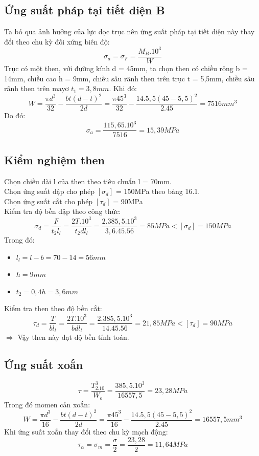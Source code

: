 \subsection{Ứng suất pháp tại tiết diện B}
Ta bỏ qua ảnh hưởng của lực dọc trục nên ứng suất pháp tại tiết diện này thay đổi theo
chu kỳ đối xứng biên độ:
\[  
    \sigma_a = \sigma_F = \frac{M_B.10^3}{W}
\]
Trục có một then, với đường kính d = 45mm, ta chọn then có chiều rộng b = 14mm, chiều cao h = 9mm, chiều sâu rãnh then trên trục t = 5,5mm, chiều sâu rãnh then trên mayơ $t_1 = 3,8 mm$. Khi đó: 
\[
    W = \frac{\pi d^3}{32} - \frac{bt(d-t)^2}{2d} = \frac{\pi 45^3}{32} - \frac{14.5,5(45-5,5)^2}{2.45} = 7516mm^3
\]
Do đó: 
\[
    \sigma_a = \frac{115,65.10^3}{7516} = 15,39MPa
\]
\subsection{Kiểm nghiệm then}
Chọn chiều dài l của then theo tiêu chuẩn l = 70mm.\\
Chọn ứng suất dập cho phép $[\sigma_d]$ = 150MPa theo bảng 16.1. \\
Chọn ứng suất cắt cho phép $[\tau_d]$ = 90MPa \\
Kiểm tra độ bền dập theo công thức:
\[
    \sigma_d = \frac{F}{t_2l_l} = \frac{2T.10^3}{t_2dl_l} = \frac{2.385,5.10^3}{3,6.45.56} = 85MPa < [\sigma_d] = 150MPa
\]
Trong đó:
\begin{itemize}
    \item $l_l = l - b = 70 - 14 = 56mm$
    \item $h = 9mm$
    \item $t_2 = 0,4h = 3,6mm$
\end{itemize}
Kiểm tra then theo độ bền cắt: 
\[
    \tau_d = \frac{T}{bl_l} = \frac{2T.10^3}{bdl_l} = \frac{2.385,5.10^3}{14.45.56} = 21,85MPa < [\tau_d] = 90MPa 
\]
$\Rightarrow$ Vậy then này đạt độ bền tính toán.
\subsection{Ứng suất xoắn}
\[
    \tau = \frac{T_2.10^3}{W_o} = \frac{385,5.10^3}{16557,5} = 23,28MPa
\]
Trong đó momen cản xoắn:
\[
    W = \frac{\pi d^3}{16} - \frac{bt(d-t)^2}{2d} = \frac{\pi 45^3}{16} - \frac{14.5,5(45-5,5)^2}{2.45} = 16557,5mm^3
\]
Khi ứng suất xoắn thay đổi theo chu kỳ mạch động: 
\[
    \tau_\alpha = \sigma_m = \frac{\sigma}{2} = \frac{23,28}{2} = 11,64MPa
\]
